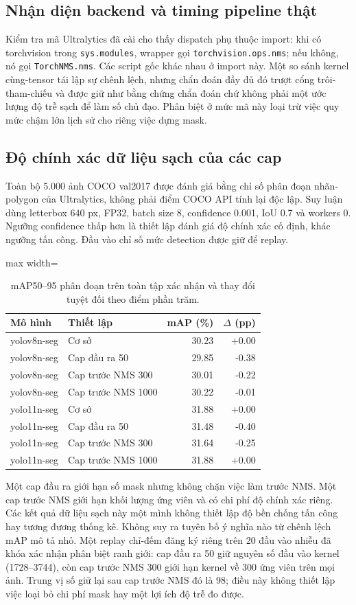 \subsection{Nhận diện backend và timing pipeline thật}
Kiểm tra mã Ultralytics đã cài cho thấy dispatch phụ thuộc import: khi có torchvision trong \texttt{sys.modules}, wrapper gọi \texttt{torchvision.ops.nms}; nếu không, nó gọi \texttt{TorchNMS.nms}. Các script gốc khác nhau ở import này. Một so sánh kernel cùng-tensor tái lập sự chênh lệch, nhưng chẩn đoán đầy đủ đó trượt cổng trôi-tham-chiếu và được giữ như bằng chứng chẩn đoán chứ không phải một ước lượng độ trễ sạch để làm số chủ đạo. Phân biệt ở mức mã này loại trừ việc quy mức chậm lớn lịch sử cho riêng việc dựng mask.

\subsection{Độ chính xác dữ liệu sạch của các cap}
Toàn bộ 5.000 ảnh COCO val2017 được đánh giá bằng chỉ số phân đoạn nhãn-polygon của Ultralytics, không phải điểm COCO API tính lại độc lập. Suy luận dùng letterbox $640$ px, FP32, batch size 8, confidence 0.001, IoU 0.7 và workers 0. Ngưỡng confidence thấp hơn là thiết lập đánh giá độ chính xác cố định, khác ngưỡng tấn công. Đầu vào chỉ số mức detection được giữ để replay.
\begin{table}[t]\centering
\caption{mAP50--95 phân đoạn trên toàn tập xác nhận và thay đổi tuyệt đối theo điểm phần trăm.}
\label{tab:seg-defense}
\begin{adjustbox}{max width=\textwidth}\begin{tabular}{llrr}\toprule Mô hình & Thiết lập & mAP (\%) & $\Delta$ (pp)\\\midrule
yolov8n-seg & Cơ sở & 30.23 & +0.00 \\
yolov8n-seg & Cap đầu ra 50 & 29.85 & -0.38 \\
yolov8n-seg & Cap trước NMS 300 & 30.01 & -0.22 \\
yolov8n-seg & Cap trước NMS 1000 & 30.22 & -0.01 \\
yolo11n-seg & Cơ sở & 31.88 & +0.00 \\
yolo11n-seg & Cap đầu ra 50 & 31.48 & -0.40 \\
yolo11n-seg & Cap trước NMS 300 & 31.64 & -0.25 \\
yolo11n-seg & Cap trước NMS 1000 & 31.88 & +0.00 \\
\bottomrule\end{tabular}\end{adjustbox}\end{table}
Một cap đầu ra giới hạn số mask nhưng không chặn việc làm trước NMS. Một cap trước NMS giới hạn khối lượng ứng viên và có chi phí độ chính xác riêng. Các kết quả dữ liệu sạch này một mình không thiết lập độ bền chống tấn công hay tương đương thống kê. Không suy ra tuyên bố ý nghĩa nào từ chênh lệch mAP mô tả nhỏ. Một replay chỉ-đếm đăng ký riêng trên 20 đầu vào nhiễu đã khóa xác nhận phân biệt ranh giới: cap đầu ra 50 giữ nguyên số đầu vào kernel (1728--3744), còn cap trước NMS 300 giới hạn kernel về 300 ứng viên trên mọi ảnh. Trung vị số giữ lại sau cap trước NMS đó là 98; điều này không thiết lập việc loại bỏ chi phí mask hay một lợi ích độ trễ đo được.
